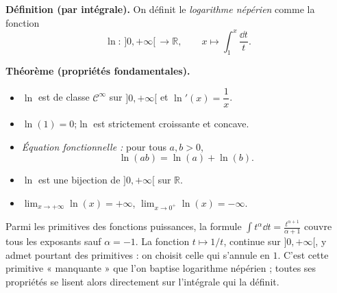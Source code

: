 ﻿%



\begin{tcolorbox}[thmbox]
  \textbf{Définition (par intégrale).}\enspace{}
  On définit le \emph{logarithme népérien} comme la fonction
  \[
    \ln :\,]0,+\infty[\,\longrightarrow \mathbb{R}, \qquad
    x \longmapsto \int_1^x \frac{\dd t}{t}.
  \]

  \medskip
  \textbf{Théorème (propriétés fondamentales).}
  \begin{itemize}
    \item $\ln$ est de classe $\mathcal{C}^{\infty}$ sur $]0,+\infty[$ et
          $\ln'(x) = \dfrac{1}{x}$.
    \item $\ln(1) = 0$\enspace;\enspace{}$\ln$ est strictement croissante et
          concave.
    \item \textit{Équation fonctionnelle :} pour tous $a, b > 0$,
    \[
      \ln(ab) = \ln(a) + \ln(b).
    \]
    \item $\ln$ est une bijection de $]0,+\infty[$ sur $\mathbb{R}$.
    \item $\displaystyle\lim_{x\to+\infty}\ln(x) = +\infty$,\qquad
          $\displaystyle\lim_{x\to 0^+}\ln(x) = -\infty$.
  \end{itemize}
\end{tcolorbox}

\begin{significationintuitive}
Parmi les primitives des fonctions puissances, la formule
$\int t^{\alpha}\dd t = \tfrac{t^{\alpha+1}}{\alpha+1}$ couvre tous les
exposants sauf $\alpha = -1$. La fonction $t\mapsto 1/t$, continue sur
$]0,+\infty[$, y admet pourtant des primitives : on choisit celle qui s'annule
en $1$. C'est cette primitive « manquante » que l'on baptise logarithme
népérien ; toutes ses propriétés se lisent alors directement sur l'intégrale
qui la définit.
\end{significationintuitive}

